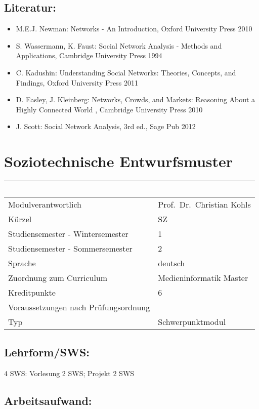 \section*{Literatur:}\label{literatur-14}

\begin{itemize}
\item
  M.E.J. Newman: Networks - An Introduction, Oxford University Press
  2010
\item
  S. Wassermann, K. Faust: Social Network Analysis - Methods and
  Applications, Cambridge University Press 1994
\item
  C. Kadushin: Understanding Social Networks: Theories, Concepts, and
  Findings, Oxford University Press 2011
\item
  D. Easley, J. Kleinberg: Networks, Crowds, and Markets: Reasoning
  About a Highly Connected World , Cambridge University Press 2010
\item
  J. Scott: Social Network Analysis, 3rd ed., Sage Pub 2012
\end{itemize}

\chapter{Soziotechnische
Entwurfsmuster}\label{soziotechnische-entwurfsmuster}

\begin{longtable}[]{@{}ll@{}}
\toprule
~ & ~\tabularnewline
\midrule
\endhead
Modulverantwortlich & Prof.~Dr.~Christian Kohls\tabularnewline
Kürzel & SZ\tabularnewline
Studiensemester - Wintersemester & 1\tabularnewline
Studiensemester - Sommersemester & 2\tabularnewline
Sprache & deutsch\tabularnewline
Zuordnung zum Curriculum & Medieninformatik Master\tabularnewline
Kreditpunkte & 6\tabularnewline
Voraussetzungen nach Prüfungsordnung &\tabularnewline
Typ & Schwerpunktmodul\tabularnewline
\bottomrule
\end{longtable}

\section*{Lehrform/SWS:}\label{lehrformsws-18}

4 SWS: Vorlesung 2 SWS; Projekt 2 SWS

\section*{Arbeitsaufwand:}\label{arbeitsaufwand-18}

